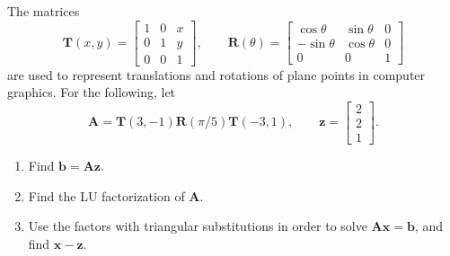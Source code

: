 \begin{exercise}\label{ex:2.7}
    The matrices
    \[
    \mathbf{T}(x,y) = \begin{bmatrix}
        1 & 0 & x \\ 
        0 & 1 & y \\ 
        0 & 0 & 1
    \end{bmatrix},\qquad
    \mathbf{R}(\theta) = \begin{bmatrix}
        \cos\theta & \sin \theta & 0 \\ 
        -\sin\theta & \cos \theta & 0 \\ 
        0 & 0 & 1
    \end{bmatrix}
    \]
    are used to represent translations and rotations of plane points in computer graphics. For the following, let
    \[
    \mathbf{A} = \mathbf{T}(3,-1)\mathbf{R}(\pi/5)\mathbf{T}(-3,1), \qquad \mathbf{z} = \begin{bmatrix}
        2 \\ 2 \\ 1
    \end{bmatrix}.
    \]
    \begin{enumerate}[label = (\alph*)]
        \item Find $\mathbf{b} = \mathbf{A}\mathbf{z}$.
        \item Find the LU factorization of $\mathbf{A}$.
        \item Use the factors with triangular substitutions in order to solve $\mathbf{A}\mathbf{x}=\mathbf{b}$, and find $\mathbf{x}-\mathbf{z}$.
    \end{enumerate}
\end{exercise}

